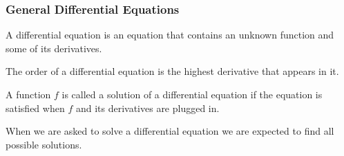 \begin{frame}
\frametitle{General Differential Equations}
\begin{definition}
A differential equation is an equation that contains an unknown function and some of its derivatives.
\end{definition}
\begin{definition}
The order of a differential equation is the highest derivative that appears in it.
\end{definition}
\begin{definition}[Solution]
A function $f$ is called a solution of a differential equation if the equation is satisfied when $f$ and its derivatives are plugged in.
\end{definition}
\begin{definition}
When we are asked to solve a differential equation we are expected to find all possible solutions.
\end{definition}
\end{frame}
